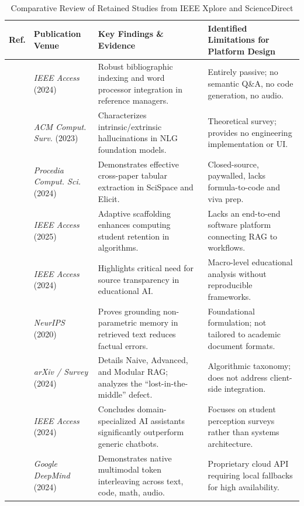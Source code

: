 \documentclass[conference]{IEEEtran}
\begin{document}
\begin{table}[t]
\centering
\caption{Comparative Review of Retained Studies from IEEE Xplore and ScienceDirect}
\label{tab:lit_review}
\begin{tabular}{@{}lp{3.5cm}p{5.5cm}p{5.5cm}@{}}
\toprule
\textbf{Ref.} & \textbf{Publication Venue} & \textbf{Key Findings \& Evidence} & \textbf{Identified Limitations for Platform Design} \\ \midrule
\cite{alharbi2024} & \textit{IEEE Access} (2024) & Robust bibliographic indexing and word processor integration in reference managers. & Entirely passive; no semantic Q\&A, no code generation, no audio. \\
\cite{ji2023} & \textit{ACM Comput. Surv.} (2023) & Characterizes intrinsic/extrinsic hallucinations in NLG foundation models. & Theoretical survey; provides no engineering implementation or UI. \\
\cite{sharma2024} & \textit{Procedia Comput. Sci.} (2024) & Demonstrates effective cross-paper tabular extraction in SciSpace and Elicit. & Closed-source, paywalled, lacks formula-to-code and viva prep. \\
\cite{ogunleye2025} & \textit{IEEE Access} (2025) & Adaptive scaffolding enhances computing student retention in algorithms. & Lacks an end-to-end software platform connecting RAG to workflows. \\
\cite{murillo2024} & \textit{IEEE Access} (2024) & Highlights critical need for source transparency in educational AI. & Macro-level educational analysis without reproducible frameworks. \\
\cite{lewis2020} & \textit{NeurIPS} (2020) & Proves grounding non-parametric memory in retrieved text reduces factual errors. & Foundational formulation; not tailored to academic document formats. \\
\cite{gao2024} & \textit{arXiv / Survey} (2024) & Details Naive, Advanced, and Modular RAG; analyzes the ``lost-in-the-middle'' defect. & Algorithmic taxonomy; does not address client-side integration. \\
\cite{alqahtani2024} & \textit{IEEE Access} (2024) & Concludes domain-specialized AI assistants significantly outperform generic chatbots. & Focuses on student perception surveys rather than systems architecture. \\
\cite{gemini2024} & \textit{Google DeepMind} (2024) & Demonstrates native multimodal token interleaving across text, code, math, audio. & Proprietary cloud API requiring local fallbacks for high availability. \\

\end{tabular}
\end{table}
\end{document}
